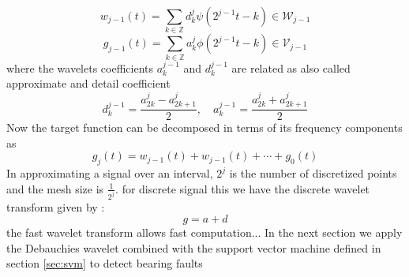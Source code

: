 \documentclass[../Main/thesis.tex]{subfiles}
\begin{document}
\begin{equation}
w_{j-1}(t) = \sum_{k\in\mathbb{Z}}d_{k}^{j}\psi\left(2^{j-1}t-k\right)\in\mathcal{W}_{j-1}
\end{equation}
\begin{equation}
g_{j-1}(t) = \sum_{k\in\mathbb{Z}}a_{k}^{j}\phi\left(2^{j-1}t-k\right)\in\mathcal{V}_{j-1}
\end{equation}
where the wavelets coefficients $a_{k}^{j-1}$ and $d_{k}^{j-1}$ are related as also called approximate and detail coefficient 
\begin{equation}
d_{k}^{j-1} = \frac{a_{2k}^{j}-a_{2k+1}^{j}}{2}, \quad a_{k}^{j-1} = \frac{a_{2k}^{j}+a_{2k+1}^{j}}{2}
\end{equation}
Now the target function can be decomposed in terms of its frequency components as 
\begin{equation}
g_{j}(t) = w_{j-1}(t) +  w_{j-1}(t)+\cdots + g_{0}(t)
\end{equation}
In approximating a signal over an interval, $2^{j}$ is the number of discretized points and the mesh size is $\frac{1}{2^{j}}$. 
for discrete signal this we have the discrete wavelet transform given by :
\begin{equation}
g = a + d
\end{equation}
the fast wavelet transform allows fast computation...
In the next section we apply the Debauchies wavelet combined with the support vector machine defined in section \ref{sec:svm} to detect bearing faults
\clearpage
\end{document}
